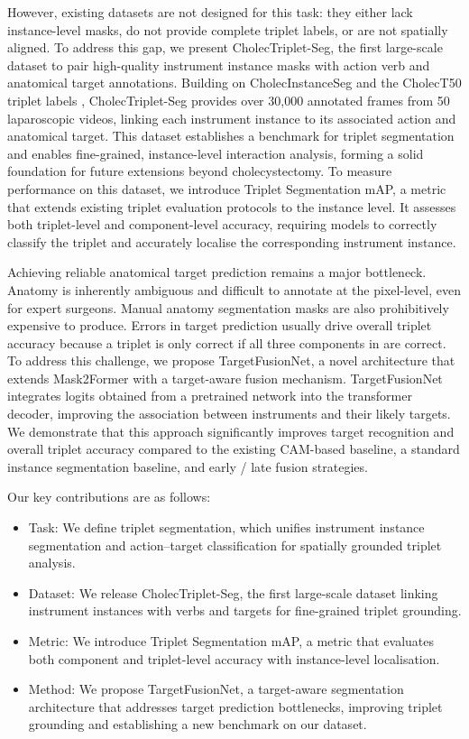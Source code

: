 However, existing datasets are not designed for this task: they either lack instance-level masks, do not provide complete triplet labels, or are not spatially aligned. 
To address this gap, we present CholecTriplet-Seg, the first large-scale dataset to pair high-quality instrument instance masks with action verb and anatomical target annotations. 
Building on CholecInstanceSeg \cite{cholecinstanceseg} and the CholecT50 triplet labels \cite{NWOYE2022102433_rendevous}, CholecTriplet-Seg provides over 30,000 annotated frames from 50 laparoscopic videos, linking each instrument instance to its associated action and anatomical target. 
This dataset establishes a benchmark for triplet segmentation and enables fine-grained, instance-level interaction analysis, forming a solid foundation for future extensions beyond cholecystectomy. 
To measure performance on this dataset, we introduce Triplet Segmentation mAP, a metric that extends existing triplet evaluation protocols to the instance level. It assesses both triplet-level and component-level accuracy, requiring models to correctly classify the triplet and accurately localise the corresponding instrument instance.

Achieving reliable anatomical target prediction remains a major bottleneck. Anatomy is inherently ambiguous and difficult to annotate at the pixel-level, even for expert surgeons. 
Manual anatomy segmentation masks are also prohibitively expensive to produce. 
Errors in target prediction usually drive overall triplet accuracy because a triplet is only correct if all three components in \ivttriplet are correct. To address this challenge, we propose TargetFusionNet, a novel architecture that extends Mask2Former \cite{cheng2022masked} with a target-aware fusion mechanism. TargetFusionNet integrates \anatprior logits obtained from a pretrained network into the transformer decoder, improving the association between instruments and their likely targets. We demonstrate that this approach significantly improves target recognition and overall triplet accuracy compared to the existing CAM-based baseline, a standard instance segmentation baseline, and early / late fusion strategies.


Our key contributions are as follows:
\begin{itemize}
\item Task: We define triplet segmentation, which unifies instrument instance segmentation and action–target classification for spatially grounded triplet analysis.
\item Dataset: We release CholecTriplet-Seg, the first large-scale dataset linking instrument instances with verbs and targets for fine-grained triplet grounding.
\item Metric: We introduce Triplet Segmentation mAP, a metric that evaluates both component and triplet-level accuracy with instance-level localisation.
\item Method: We propose TargetFusionNet, a target-aware segmentation architecture that  addresses target prediction bottlenecks, improving triplet grounding and establishing a new benchmark on our dataset.
\end{itemize}



